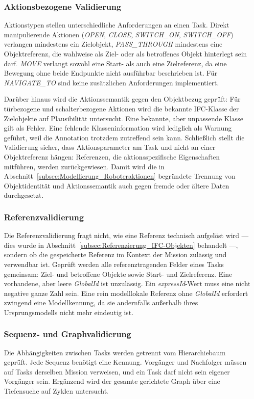 \subsubsection{Aktionsbezogene Validierung}
Aktionstypen stellen unterschiedliche Anforderungen an einen Task. Direkt manipulierende Aktionen
(\textit{OPEN}, \textit{CLOSE}, \textit{SWITCH\_ON}, \textit{SWITCH\_OFF}) verlangen mindestens ein
Zielobjekt, \textit{PASS\_THROUGH} mindestens eine Objektreferenz, die wahlweise als Ziel- oder als
betroffenes Objekt hinterlegt sein darf. \textit{MOVE} verlangt sowohl eine Start- als auch eine
Zielreferenz, da eine Bewegung ohne beide Endpunkte nicht ausführbar beschrieben ist. Für
\textit{NAVIGATE\_TO} sind keine zusätzlichen Anforderungen implementiert.

Darüber hinaus wird die Aktionssemantik gegen den Objektbezug geprüft: Für türbezogene und
schalterbezogene Aktionen wird die bekannte IFC-Klasse der Zielobjekte auf Plausibilität untersucht.
Eine bekannte, aber unpassende Klasse gilt als Fehler. Eine fehlende Klasseninformation wird
lediglich als Warnung geführt, weil die Annotation trotzdem zutreffend sein kann. Schließlich stellt
die Validierung sicher, dass Aktionsparameter am Task und nicht an einer Objektreferenz hängen:
Referenzen, die aktionsspezifische Eigenschaften mitführen, werden zurückgewiesen. Damit wird die in
Abschnitt~\ref{subsec:Modellierung_Roboteraktionen} begründete Trennung von Objektidentität und Aktionssemantik auch gegen fremde oder
ältere Daten durchgesetzt.

\subsubsection{Referenzvalidierung}
Die Referenzvalidierung fragt nicht, wie eine Referenz technisch aufgelöst wird — dies wurde in
Abschnitt~\ref{subsec:Referenzierung_IFC-Objekten} behandelt —, sondern ob die gespeicherte Referenz im Kontext der Mission zulässig und
verwendbar ist. Geprüft werden alle referenztragenden Felder eines Tasks gemeinsam: Ziel- und
betroffene Objekte sowie Start- und Zielreferenz. Eine vorhandene, aber leere \textit{GlobalId} ist
unzulässig. Ein \textit{expressId}-Wert muss eine nicht negative ganze Zahl sein. Eine rein
modelllokale Referenz ohne \textit{GlobalId} erfordert zwingend eine Modellkennung, da sie
andernfalls außerhalb ihres Ursprungsmodells nicht mehr eindeutig ist.

\subsubsection{Sequenz- und Graphvalidierung}
Die Abhängigkeiten zwischen Tasks werden getrennt vom Hierarchiebaum geprüft. Jede Sequenz benötigt
eine Kennung. Vorgänger und
Nachfolger müssen auf Tasks derselben Mission verweisen, und ein Task darf nicht sein eigener
Vorgänger sein. Ergänzend wird der gesamte gerichtete Graph über eine Tiefensuche auf Zyklen
untersucht.

